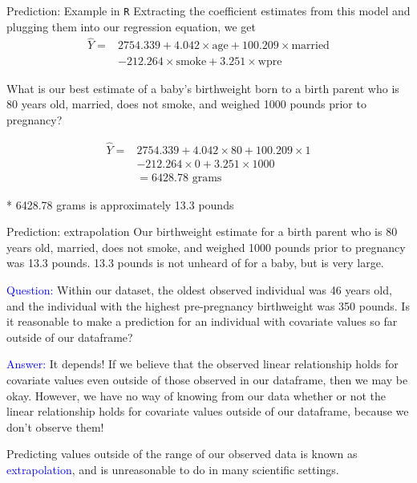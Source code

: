 \documentclass[10pt,t]{beamer}
\begin{document}
\begin{frame}{Prediction: Example in \texttt{R}}
Extracting the coefficient estimates from this model and plugging them into our regression equation, we get
\begin{align*}
\hat{Y} = & 2754.339 + 4.042 \times \text{age} + 100.209 \times \text{married} \\
& - 212.264 \times \text{smoke} + 3.251 \times \text{wpre}
\end{align*}

What is our best estimate of a baby's birthweight born to a birth parent who is 80 years old, married, does not smoke, and weighed 1000 pounds prior to pregnancy? \pause

\begin{align*}
\hat{Y} = & 2754.339 + 4.042 \times 80 + 100.209 \times 1 \\
& - 212.264 \times 0 + 3.251 \times 1000  \\
& = 6428.78 \text{ grams}
\end{align*}

* 6428.78 grams is approximately 13.3 pounds

\end{frame}

\begin{frame}{Prediction: extrapolation}
Our birthweight estimate for a birth parent who is 80 years old, married, does not smoke, and weighed 1000 pounds prior to pregnancy was 13.3 pounds. 13.3 pounds is not unheard of for a baby, but is very large.

\vspace{0.3cm}

\textcolor{blue}{Question:} Within our dataset, the oldest observed individual was 46 years old, and the individual with the highest pre-pregnancy birthweight was 350 pounds. Is it reasonable to make a prediction for an individual with covariate values so far outside of our dataframe? \pause

\vspace{0.3cm}

\textcolor{blue}{Answer:} It depends! If we believe that the observed linear relationship holds for covariate values even outside of those observed in our dataframe, then we may be okay. However, we have no way of knowing from our data whether or not the linear relationship holds for covariate values outside of our dataframe, because we don't observe them! 

\vspace{0.3cm}

\small Predicting values outside of the range of our observed data is known as \textcolor{blue}{extrapolation}, and is unreasonable to do in many scientific settings.

\end{frame}
\end{document}
